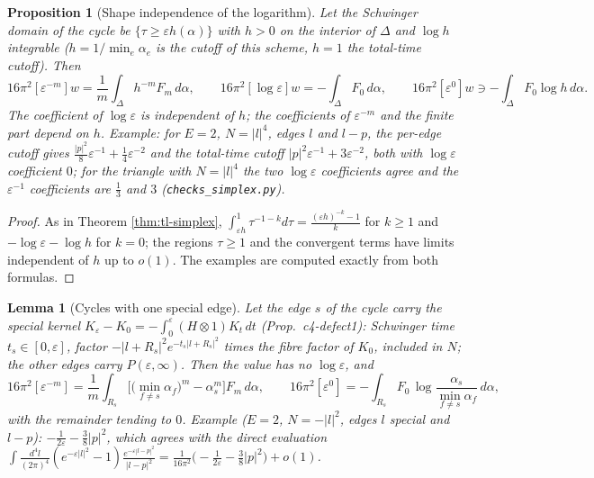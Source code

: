 \documentclass[11pt]{article}
\numberwithin{equation}{section}
\theoremstyle{plain}
\newtheorem{proposition}[theorem]{Proposition}
\newtheorem{lemma}[theorem]{Lemma}
\theoremstyle{definition}
\begin{document}
\begin{proposition}[Shape independence of the logarithm]
\label{prop:tl-shape}
Let the Schwinger domain of the cycle be $\{\tau\ge\varepsilon h(\alpha)\}$ with $h>0$ on the interior of $\Delta$ and $\log h$ integrable ($h=1/\min_e\alpha_e$ is the cutoff of this scheme, $h=1$ the total-time cutoff). Then
\[
16\pi^2[\varepsilon^{-m}]w=\frac1m\int_\Delta h^{-m}F_m\,d\alpha,\qquad 16\pi^2[\log\varepsilon]w=-\int_\Delta F_0\,d\alpha,\qquad 16\pi^2[\varepsilon^0]w\ni-\int_\Delta F_0\log h\,d\alpha .
\]
The coefficient of $\log\varepsilon$ is independent of $h$; the coefficients of $\varepsilon^{-m}$ and the finite part depend on $h$. Example: for $E=2$, $N=|l|^4$, edges $l$ and $l-p$, the per-edge cutoff gives $\frac{|p|^2}{8}\varepsilon^{-1}+\frac14\varepsilon^{-2}$ and the total-time cutoff $|p|^2\varepsilon^{-1}+3\varepsilon^{-2}$, both with $\log\varepsilon$ coefficient $0$; for the triangle with $N=|l|^4$ the two $\log\varepsilon$ coefficients agree and the $\varepsilon^{-1}$ coefficients are $\frac13$ and $3$ (\texttt{checks\_simplex.py}).
\end{proposition}

\begin{proof}
As in Theorem \ref{thm:tl-simplex}, $\int_{\varepsilon h}^1\tau^{-1-k}d\tau=\frac{(\varepsilon h)^{-k}-1}k$ for $k\ge1$ and $-\log\varepsilon-\log h$ for $k=0$; the regions $\tau\ge1$ and the convergent terms have limits independent of $h$ up to $o(1)$. The examples are computed exactly from both formulas.
\end{proof}

\begin{lemma}[Cycles with one special edge]
\label{lem:tl-special}
Let the edge $s$ of the cycle carry the special kernel $K_\varepsilon-K_0=-\int_0^\varepsilon(H\otimes1)K_t\,dt$ (Prop.~c4-defect1): Schwinger time $t_s\in[0,\varepsilon]$, factor $-|l+R_s|^2e^{-t_s|l+R_s|^2}$ times the fibre factor of $K_0$, included in $N$; the other edges carry $P(\varepsilon,\infty)$. Then the value has no $\log\varepsilon$, and
\[
16\pi^2[\varepsilon^{-m}]=\frac1m\int_{R_s}\Big[\big(\min_{f\ne s}\alpha_f\big)^m-\alpha_s^m\Big]F_m\,d\alpha,\qquad 16\pi^2[\varepsilon^0]=-\int_{R_s}F_0\,\log\frac{\alpha_s}{\min_{f\ne s}\alpha_f}\,d\alpha ,
\]
with the remainder tending to $0$. Example ($E=2$, $N=-|l|^2$, edges $l$ special and $l-p$): $-\frac1{2\varepsilon}-\frac38|p|^2$, which agrees with the direct evaluation $\int\frac{d^4l}{(2\pi)^4}(e^{-\varepsilon|l|^2}-1)\frac{e^{-\varepsilon|l-p|^2}}{|l-p|^2}=\frac{1}{16\pi^2}\big(-\frac1{2\varepsilon}-\frac38|p|^2\big)+o(1)$.
\end{lemma}
\end{document}

